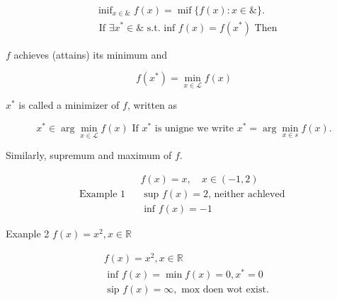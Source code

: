 \documentclass[11pt,a4paper]{article}
\begin{document}
$$
\begin{aligned}
&\operatorname{inif}_{x \in \&} f(x)=\operatorname{mif}\{f(x): x \in \&\} . \\
&\text { If } \exists x^{*} \in \& \text { s.t. inf } f(x)=f\left(x^{*}\right) \text { Then }
\end{aligned}
$$

$f$ achieves (attains) its minimum and

$$
f\left(x^{*}\right)=\min _{x \in \mathcal{L}} f(x)
$$

$x^{*}$ is called a minimizer of $f$, written as

$$
x^{*} \in \arg \min _{x \in \mathcal{L}} f(x) {\text { If } x^{*} \text { is unigne we write } x^{*}=\arg \min _{x \in s} f(x).}
$$

Similarly, supremum and maximum of $f$.

$$
\text { Example 1 } \begin{aligned}
& f(x)=x, \quad x \in(-1,2) \\
& \text { sup } f(x)=2 \text {, neither achleved } \\
& \text { inf } f(x)=-1
\end{aligned}
$$

Exanple 2 $f(x)=x^{2}, x \in \mathbb{R}$

$$
\begin{aligned}
&f(x)=x^{2}, x \in \mathbb{R} \\
&\text { inf } f(x)=\min f(x)=0, x^{*}=0 \\
&\text { sip } f(x)=\infty, \text { mox doen wot exist. }
\end{aligned}
$$
\end{document}
